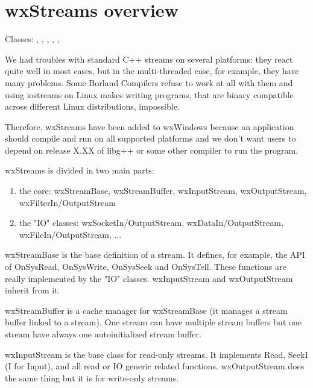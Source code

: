 \section{wxStreams overview}\label{wxstreamoverview}

Classes: ,
 , ,
 ,
 ,


We had troubles with standard C++ streams on several platforms:
they react quite well in most cases, but in the multi-threaded case, for example,
they have many problems. Some Borland Compilers refuse to work at all
with them and using iostreams on Linux makes writing programs, that are
binary compatible across different Linux distributions, impossible.

Therefore, wxStreams have been added to wxWindows because an application should 
compile and run on all supported platforms and we don't want users to depend on release
X.XX of libg++ or some other compiler to run the program.

wxStreams is divided in two main parts:

\begin{enumerate}\itemsep=0pt
\item the core: wxStreamBase, wxStreamBuffer, wxInputStream, wxOutputStream,
wxFilterIn/OutputStream
\item the "IO" classes: wxSocketIn/OutputStream, wxDataIn/OutputStream, wxFileIn/OutputStream, ...
\end{enumerate}

wxStreamBase is the base definition of a stream. It defines, for example,
the API of OnSysRead, OnSysWrite, OnSysSeek and OnSysTell. These functions 
are really implemented by the "IO" classes.
wxInputStream and wxOutputStream inherit from it.

wxStreamBuffer is a cache manager for wxStreamBase (it manages a stream buffer
linked to a stream). One stream can have multiple stream buffers  but one stream
have always one autoinitialized stream buffer.

wxInputStream is the base class for read-only streams. It implements Read,
SeekI (I for Input), and all read or IO generic related functions.
wxOutputStream does the same thing but it is for write-only streams.


